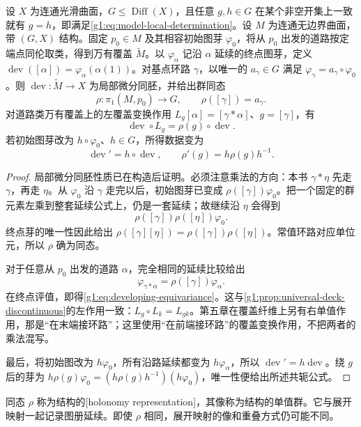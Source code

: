 \begin{theorem}
	\label{g1:thm:developing-map}
	设 \(X\) 为连通光滑曲面，\(G\le\operatorname{Diff}(X)\)，且任意 \(g,h\in G\) 在某个非空开集上一致就有 \(g=h\)，即满足\eqref{g1:eq:model-local-determination}。设 \(M\) 为连通无边界曲面，带 \((G,X)\) 结构。固定 \(p_0\in M\) 及其相容初始图芽 \(\varphi_0\)，将从 \(p_0\) 出发的道路按定端点同伦取类，得到万有覆盖 \(\widetilde M\)。以 \(\varphi_\alpha\) 记沿 \(\alpha\) 延续的终点图芽，定义 \(\operatorname{dev}([\alpha])=\varphi_\alpha(\alpha(1))\)。对基点环路 \(\gamma\)，以唯一的 \(a_\gamma\in G\) 满足 \(\varphi_\gamma=a_\gamma\circ\varphi_0\)。则 \(\operatorname{dev}:\widetilde M\to X\) 为局部微分同胚，并给出群同态
	\[
		\rho:\pi_1(M,p_0)\longrightarrow G,\qquad \rho([\gamma])=a_\gamma.
	\]
	对道路类万有覆盖上的左覆盖变换作用 \(L_g[\alpha]=[\gamma*\alpha]\)、\(g=[\gamma]\)，有
	\begin{equation}
		\label{g1:eq:developing-equivariance}
		\operatorname{dev}\circ L_g=\rho(g)\circ\operatorname{dev}.
	\end{equation}
	若初始图芽改为 \(h\circ\varphi_0\)、\(h\in G\)，所得数据变为
	\[
		\operatorname{dev}'=h\circ\operatorname{dev},\qquad
		\rho'(g)=h\rho(g)h^{-1}.
	\]
\end{theorem}
\begin{proof}
	局部微分同胚性质已在构造后证明。必须注意乘法的方向：本书 \(\gamma*\eta\) 先走 \(\gamma\)，再走 \(\eta\)。从 \(\varphi_0\) 沿 \(\gamma\) 走完以后，初始图芽已变成 \(\rho([\gamma])\varphi_0\)。把一个固定的群元素左乘到整套延续公式上，仍是一套延续；故继续沿 \(\eta\) 会得到
	\[
		\rho([\gamma])\rho([\eta])\varphi_0.
	\]
	终点芽的唯一性因此给出 \(\rho([\gamma][\eta])=\rho([\gamma])\rho([\eta])\)。常值环路对应单位元，所以 \(\rho\) 确为同态。

	对于任意从 \(p_0\) 出发的道路 \(\alpha\)，完全相同的延续比较给出
	\[
		\varphi_{\gamma*\alpha}=\rho([\gamma])\varphi_\alpha.
	\]
	在终点评值，即得\eqref{g1:eq:developing-equivariance}。这与\cref{g1:prop:universal-deck-discontinuous}的左作用一致：\(L_g\circ L_k=L_{gk}\)。第五章在覆盖纤维上另有右单值作用，那是“在末端接环路”；这里使用“在前端接环路”的覆盖变换作用，不把两者的乘法混写。

	最后，将初始图改为 \(h\varphi_0\)，所有沿路延续都变为 \(h\varphi_\alpha\)，所以 \(\operatorname{dev}'=h\operatorname{dev}\)。绕 \(g\) 后的芽为 \(h\rho(g)\varphi_0=(h\rho(g)h^{-1})(h\varphi_0)\)，唯一性便给出所述共轭公式。
\end{proof}

同态 \(\rho\) 称为结构的[holonomy representation]，其像称为结构的单值群。它与展开映射一起记录图册延续。即使 \(\rho\) 相同，展开映射的像和重叠方式仍可能不同。

